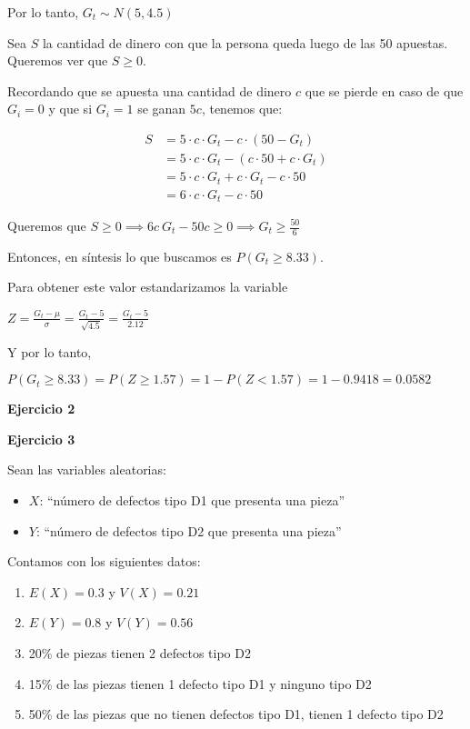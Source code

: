 \documentclass[11pt]{article}
\begin{document}
Por lo tanto, 
$ G_t \sim N(5,4.5)$

Sea $S$ la cantidad de dinero con que la persona queda luego de las 50 apuestas. Queremos ver que $S\geq 0$. 

Recordando que se apuesta una cantidad de dinero $c$ que se pierde en caso de que $G_i=0$ y que si $G_i=1$ se ganan $5c$, tenemos que:

\begin{align*}
    S &= 5\cdot c \cdot G_t - c\cdot (50 - G_t) \\
      &= 5\cdot c \cdot G_t - (c \cdot 50 + c\cdot G_t) \\
      &= 5\cdot c \cdot G_t + c\cdot G_t - c\cdot 50 \\
      &= 6\cdot c \cdot G_t - c\cdot 50
\end{align*}

Queremos que $S \geq 0 \implies 6c \ G_t - 50c \geq 0 \implies G_t \geq \frac{50}{6}$  

Entonces, en s\'intesis lo que buscamos es $P(G_t\geq 8.33)$. 

Para obtener este valor estandarizamos la variable 

$ Z = \frac{G_t - \mu}{\sigma} = \frac{G_t - 5}{\sqrt{4.5}} = \frac{G_t - 5}{2.12}$

Y por lo tanto,

$P(G_t\geq 8.33) = P(Z \geq 1.57) = 1 - P(Z < 1.57) = 1 - 0.9418 = 0.0582$


\textbf{Ejercicio 2}



\textbf{Ejercicio 3}

Sean las variables aleatorias:
\begin{itemize}
    \item $X$: ``n\'umero de defectos tipo D1 que presenta una pieza''
    \item $Y$: ``n\'umero de defectos tipo D2 que presenta una pieza''
\end{itemize}
Contamos con los siguientes datos:
\begin{enumerate}
    \item $E(X) = 0.3$ y $V(X) = 0.21$
    \item $E(Y) = 0.8$ y $V(Y) = 0.56$
    \item 20\% de piezas tienen 2 defectos tipo D2
    \item 15\% de las piezas tienen 1 defecto tipo D1 y ninguno tipo D2
    \item 50\% de las piezas que no tienen defectos tipo D1, tienen 1 defecto tipo D2
\end{enumerate}
\end{document}
